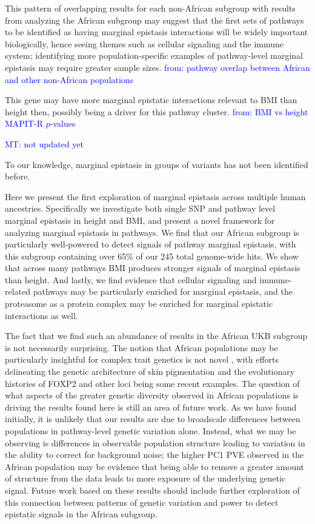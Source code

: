 \documentclass[12pt,a4paper]{article}
\begin{document}
This pattern of overlapping results for each non-African subgroup with results from analyzing  the African subgroup may suggest that the first sets of pathways to be identified as having marginal epistasis interactions will be widely important biologically, hence seeing themes such as cellular signaling and the immune system; identifying more population-specific examples of pathway-level marginal epistasis may require greater sample sizes. \textcolor{blue}{from: pathway overlap between African and other non-African populations}

 This gene may have more marginal epistatic interactions relevant to BMI than height then, possibly being a driver for this pathway cluster. \textcolor{blue}{from: BMI vs height MAPIT-R $p$-values}

\textcolor{blue}{MT: not updated yet}

To our knowledge, marginal epistasis in groups of variants has not been identified before. 

Here we present the first exploration of marginal epistasis across multiple human ancestries. Specifically we investigate both single SNP and pathway level marginal epistasis in height and BMI, and present a novel framework for analyzing marginal epistasis in pathways. We find that our African subgroup is particularly well-powered to detect signals of pathway marginal epistasis, with this subgroup containing over 65\% of our 245 total genome-wide hits. We show that across many pathways BMI produces stronger signals of marginal epistasis than height. And lastly, we find evidence that cellular signaling and immune-related pathways may be particularly enriched for marginal epistasis, and the proteasome as a protein complex may be enriched for marginal epistatic interactions as well. 

The fact that we find such an abundance of results in the African UKB subgroup is not necessarily surprising. The notion that African populations may be particularly insightful for complex trait genetics is not novel \citep{Rotimi2017,Choudhury2018,Martin2018,Bentley2020}, with efforts delineating the genetic architecture of skin pigmentation \citep{Martin2017b,Crawford2017b} and the evolutionary histories of FOXP2 and other loci \citep{Atkinson2018,Sugden2018} being some recent examples. The question of what aspects of the greater genetic diversity observed in African populations is driving the results found here is still an area of future work. As we have found initially, it is unlikely that our results are due to broadscale differences between populations in pathway-level genetic variation alone. Instead, what we may be observing is differences in observable population structure leading to variation in the ability to correct for background noise; the higher PC1 PVE observed in the African population may be evidence that being able to remove a greater amount of structure from the data leads to more exposure of the underlying genetic signal. Future work based on these results should include further exploration of this connection between patterns of genetic variation and power to detect epistatic signals in the African subgroup.  
\end{document}
